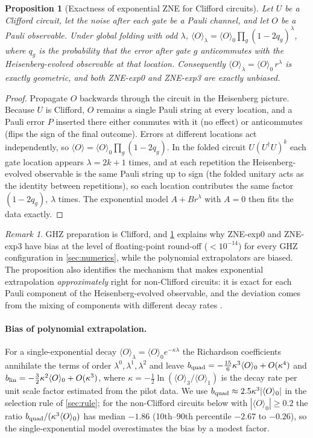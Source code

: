 \documentclass[aps,pra,reprint,amsmath,amssymb,nofootinbib,superscriptaddress]{revtex4-2}
\newtheorem{proposition}{Proposition}
\theoremstyle{remark}
\newtheorem{remark}{Remark}
\begin{document}
\begin{proposition}[Exactness of exponential ZNE for Clifford circuits]
\label{prop:clifford}
Let $U$ be a Clifford circuit, let the noise after each gate be a Pauli channel, and let $O$ be a Pauli observable. Under global folding with odd $\lambda$, $\langle O\rangle_\lambda = \langle O\rangle_0\prod_g (1-2q_g)^{\lambda}$, where $q_g$ is the probability that the error after gate $g$ anticommutes with the Heisenberg-evolved observable at that location. Consequently $\langle O\rangle_\lambda = \langle O\rangle_0\,r^\lambda$ is exactly geometric, and both ZNE-exp0 and ZNE-exp3 are exactly unbiased.
\end{proposition}
\begin{proof}
Propagate $O$ backwards through the circuit in the Heisenberg picture. Because $U$ is Clifford, $O$ remains a single Pauli string at every location, and a Pauli error $P$ inserted there either commutes with it (no effect) or anticommutes (flips the sign of the final outcome). Errors at different locations act independently, so $\langle O\rangle = \langle O\rangle_0\prod_g(1-2q_g)$. In the folded circuit $U(U^\dagger U)^k$ each gate location appears $\lambda=2k+1$ times, and at each repetition the Heisenberg-evolved observable is the same Pauli string up to sign (the folded unitary acts as the identity between repetitions), so each location contributes the same factor $(1-2q_g)$, $\lambda$ times. The exponential model $A+Br^\lambda$ with $A=0$ then fits the data exactly.
\end{proof}
\begin{remark}
GHZ preparation is Clifford, and \cref{prop:clifford} explains why ZNE-exp0 and ZNE-exp3 have bias at the level of floating-point round-off ($<10^{-14}$) for every GHZ configuration in \cref{sec:numerics}, while the polynomial extrapolators are biased. The proposition also identifies the mechanism that makes exponential extrapolation \emph{approximately} right for non-Clifford circuits: it is exact for each Pauli component of the Heisenberg-evolved observable, and the deviation comes from the mixing of components with different decay rates \cite{cai2021}.
\end{remark}

\paragraph{Bias of polynomial extrapolation.}
For a single-exponential decay $\langle O\rangle_\lambda=\langle O\rangle_0e^{-\kappa\lambda}$ the Richardson coefficients annihilate the terms of order $\lambda^0,\lambda^1,\lambda^2$ and leave $b_{\rm quad}=-\tfrac{15}{6}\kappa^3\langle O\rangle_0+O(\kappa^4)$ and $b_{\rm lin}=-\tfrac32\kappa^2\langle O\rangle_0+O(\kappa^3)$, where $\kappa=-\tfrac12\ln(\langle O\rangle_3/\langle O\rangle_1)$ is the decay rate per unit scale factor estimated from the pilot data. We use $b_{\rm quad}\approx 2.5\kappa^3|\langle O\rangle_0|$ in the selection rule of \cref{sec:rule}; for the non-Clifford circuits below with $|\langle O\rangle_0|\ge0.2$ the ratio $b_{\rm quad}/(\kappa^3\langle O\rangle_0)$ has median $-1.86$ (10th--90th percentile $-2.67$ to $-0.26$), so the single-exponential model overestimates the bias by a modest factor.
\end{document}
